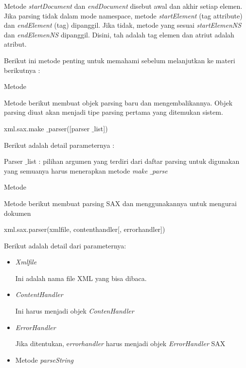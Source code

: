 \noindent 
 \hspace*{0.5in} Metode \textit{startDocument} dan \textit{endDocument} disebut awal dan akhir setiap elemen. Jika parsing tidak dalam mode namespace, metode \textit{startElement} (tag attribute) dan \textit{endElement} (tag) dipanggil. Jika tidak, metode yang sesuai \textit{startElemenNS} dan \textit{endElemenNS} dipanggil. Disini, tah adalah tag elemen dan atriut adalah atribut.  \par
\noindent 
 \hspace*{0.5in} Berikut ini metode penting untuk memahami sebelum melanjutkan ke materi berikutnya : \par
\noindent 
Metode\par
Metode berikut membuat objek parsing baru dan mengembalikannya. Objek parsing diuat akan menjadi tipe parsing pertama yang ditemukan sistem.  \par
\vspace{10pt}
{\fontsize{10pt}{10pt}\selectfont xml.sax.make $  \_  $parser([parser $  \_  $list])} \par
\vspace{12pt}
Berikut adalah detail parameternya : \par
Parser $  \_  $list : pilihan argumen yang terdiri dari daftar parsing untuk digunakan yang semuanya harus menerapkan metode \textit{make $  \_  $parse} \par
\noindent 
Metode\par
Metode berikut membuat parsing SAX dan menggunakannya untuk mengurai dokumen \par
\vspace{10pt}
{\fontsize{10pt}{10pt}\selectfont xml.sax.parser(xmlfile, contenthandler[, errorhandler])} \par
\vspace{10pt}
Berikut adalah detail dari parameternya: \par
\noindent 
\begin{itemize}
\item \textit{Xmlfile } \par
Ini adalah nama file XML yang bisa dibaca. \par
\noindent 
\item \textit{ContentHandler } \par
Ini harus menjadi objek \textit{ContenHandler} \par
\noindent 
\item \textit{ErrorHandler} \par
Jika ditentukan, e\textit{rrorhandler} harus menjadi objek \textit{ErrorHandler} SAX \par
\noindent 
\item Metode\textit{ parseString}\end{itemize}
